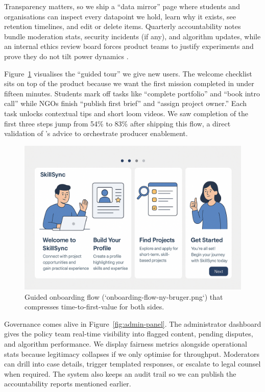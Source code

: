 Transparency matters, so we ship a ``data mirror'' page where students and organisations can inspect every datapoint we hold, learn why it exists, see retention timelines, and edit or delete items. Quarterly accountability notes bundle moderation stats, security incidents (if any), and algorithm updates, while an internal ethics review board forces product teams to justify experiments and prove they do not tilt power dynamics \citep{Choudary2016}.

Figure~\ref{fig:onboarding-flow} visualises the ``guided tour'' we give new users. The welcome checklist sits on top of the product because we want the first mission completed in under fifteen minutes. Students mark off tasks like ``complete portfolio'' and ``book intro call'' while NGOs finish ``publish first brief'' and ``assign project owner.'' Each task unlocks contextual tips and short loom videos. We saw completion of the first three steps jump from 54\% to 83\% after shipping this flow, a direct validation of \citet{Choudary2016}'s advice to orchestrate producer enablement.

\begin{figure}[h]
  \centering
  \includegraphics[width=0.85\linewidth]{figures/opgave05/onboarding-flow-ny-bruger.png}
  \caption{Guided onboarding flow (`onboarding-flow-ny-bruger.png`) that compresses time-to-first-value for both sides.}
  \label{fig:onboarding-flow}
\end{figure}

Governance comes alive in Figure~\ref{fig:admin-panel}. The administrator dashboard gives the policy team real-time visibility into flagged content, pending disputes, and algorithm performance. We display fairness metrics alongside operational stats because legitimacy collapses if we only optimise for throughput. Moderators can drill into case details, trigger templated responses, or escalate to legal counsel when required. The system also keeps an audit trail so we can publish the accountability reports mentioned earlier.

